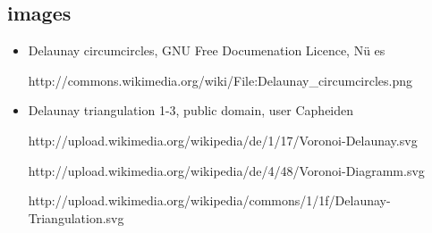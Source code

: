 \documentclass[a4paper,12pt]{article}
\begin{document}
\subsection{images}
\begin{itemize}
\item
Delaunay circumcircles, GNU Free Documenation Licence, N\"u es

http://commons.wikimedia.org/wiki/File:Delaunay\_circumcircles.png

\item
Delaunay triangulation 1-3, public domain, user Capheiden 

http://upload.wikimedia.org/wikipedia/de/1/17/Voronoi-Delaunay.svg

http://upload.wikimedia.org/wikipedia/de/4/48/Voronoi-Diagramm.svg

http://upload.wikimedia.org/wikipedia/commons/1/1f/Delaunay-Triangulation.svg

\end{itemize}
\end{document}
